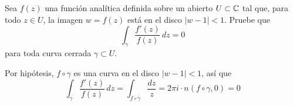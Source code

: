 \begin{exercise}
Sea $f(z)$ una función analítica definida sobre un abierto $U \subset \mathbb C$ tal que, para todo $z \in U$, la imagen $w = f(z)$ está en el disco $|w - 1| < 1$. Pruebe que
$$\int_\gamma \frac {f'(z)} {f(z)} \, dz = 0$$
para toda curva cerrada $\gamma \subset U$.
\end{exercise}

\begin{solution}
Por hipótesis, $f \circ \gamma$ es una curva en el disco $|w - 1| < 1$, así que
$$\int_\gamma \frac {f'(z)} {f(z)} \, dz = \int_{f \circ \gamma} \frac {dz} z = 2\pi i \cdot n(f \circ \gamma, 0) = 0$$
\end{solution}

\newpage
